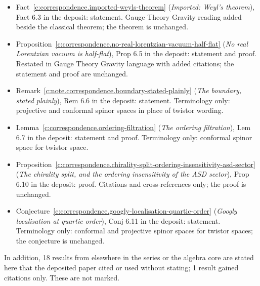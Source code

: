 \documentclass[11pt]{article}
\theoremstyle{definition}
\theoremstyle{plain}
\begin{document}
\begin{itemize}
\item Fact~\ref{c:correspondence.imported-weyls-theorem} (\emph{Imported: Weyl's theorem}), Fact 6.3 in the deposit: statement. Gauge Theory Gravity reading added beside the classical theorem; the theorem is unchanged.
\item Proposition~\ref{c:correspondence.no-real-lorentzian-vacuum-half-flat} (\emph{No real Lorentzian vacuum is half-flat}), Prop 6.5 in the deposit: statement and proof. Restated in Gauge Theory Gravity language with added citations; the statement and proof are unchanged.
\item Remark~\ref{c:note.correspondence.boundary-stated-plainly} (\emph{The boundary, stated plainly}), Rem 6.6 in the deposit: statement. Terminology only: projective and conformal spinor spaces in place of twistor wording.
\item Lemma~\ref{c:correspondence.ordering-filtration} (\emph{The ordering filtration}), Lem 6.7 in the deposit: statement and proof. Terminology only: conformal spinor space for twistor space.
\item Proposition~\ref{c:correspondence.chirality-split-ordering-insensitivity-asd-sector} (\emph{The chirality split, and the ordering insensitivity of the ASD sector}), Prop 6.10 in the deposit: proof. Citations and cross-references only; the proof is unchanged.
\item Conjecture~\ref{c:correspondence.googly-localisation-quartic-order} (\emph{Googly localisation at quartic order}), Conj 6.11 in the deposit: statement. Terminology only: conformal and projective spinor spaces for twistor spaces; the conjecture is unchanged.
\end{itemize}
\noindent In addition, 18 results from elsewhere in the series or the algebra core are stated here that the deposited paper cited or used without stating; 1 result gained citations only. These are not marked.
\end{document}
